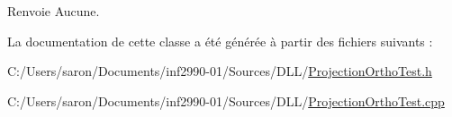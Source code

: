\begin{DoxyReturn}{Renvoie}
Aucune. 
\end{DoxyReturn}


La documentation de cette classe a été générée à partir des fichiers suivants \-:\begin{DoxyCompactItemize}
\item 
C\-:/\-Users/saron/\-Documents/inf2990-\/01/\-Sources/\-D\-L\-L/\hyperlink{_projection_ortho_test_8h}{Projection\-Ortho\-Test.\-h}\item 
C\-:/\-Users/saron/\-Documents/inf2990-\/01/\-Sources/\-D\-L\-L/\hyperlink{_projection_ortho_test_8cpp}{Projection\-Ortho\-Test.\-cpp}\end{DoxyCompactItemize}
